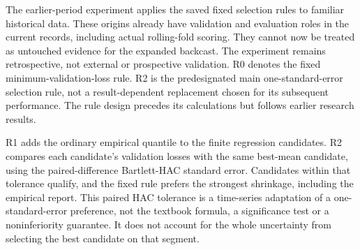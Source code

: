 \documentclass[10pt,a4paper]{article}
\begin{document}
The earlier-period experiment applies the saved fixed selection rules
to familiar historical data. These origins already have validation and
evaluation roles in the current records, including actual rolling-fold
scoring. They cannot now be treated as untouched evidence for the expanded
backcast. The experiment remains retrospective, not external or prospective
validation. R0 denotes the fixed minimum-validation-loss rule. R2 is the predesignated main one-standard-error selection rule,
not a result-dependent replacement chosen for its subsequent performance.
The rule design precedes its calculations but follows earlier research results.

R1 adds the ordinary empirical quantile to the finite regression candidates.
R2 compares each candidate's validation losses with the same best-mean
candidate, using the paired-difference Bartlett-HAC standard error. Candidates
within that tolerance qualify, and the fixed rule prefers the strongest
shrinkage, including the empirical report. This paired HAC tolerance is a
time-series adaptation of a one-standard-error preference, not the textbook
formula, a significance test or a noninferiority guarantee. It does not account
for the whole uncertainty from selecting the best candidate on that segment.
\end{document}

